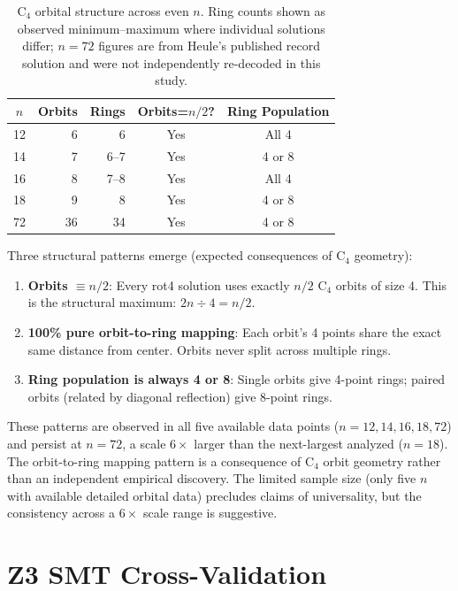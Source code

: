 \documentclass[11pt,a4paper]{article}
\theoremstyle{plain}
\theoremstyle{definition}
\begin{document}
\begin{table}[H]
\centering
\caption{C$_4$ orbital structure across even $n$. Ring counts shown as observed minimum--maximum where individual solutions differ; $n=72$ figures are from Heule's published record solution and were not independently re-decoded in this study.}
\label{tab:c4evol}
\begin{tabular}{crrcc}
\toprule
$n$ & Orbits & Rings & Orbits=$n/2$? & Ring Population \\
\midrule
12 & 6 & 6 & Yes & All 4 \\
14 & 7 & 6--7 & Yes & 4 or 8 \\
16 & 8 & 7--8 & Yes & All 4 \\
18 & 9 & 8 & Yes & 4 or 8 \\
72 & 36 & 34 & Yes & 4 or 8 \\
\bottomrule
\end{tabular}
\end{table}

Three structural patterns emerge (expected consequences of C$_4$ geometry):

\begin{enumerate}[nosep]
\item \textbf{Orbits $\equiv n/2$}: Every rot4 solution uses exactly $n/2$ C$_4$ orbits of size 4. This is the structural maximum: $2n\div4=n/2$.
\item \textbf{100\% pure orbit-to-ring mapping}: Each orbit's 4 points share the exact same distance from center. Orbits never split across multiple rings.
\item \textbf{Ring population is always 4 or 8}: Single orbits give 4-point rings; paired orbits (related by diagonal reflection) give 8-point rings.
\end{enumerate}

These patterns are observed in all five available data points ($n=12,14,16,18,72$) and persist at $n=72$, a scale $6\times$ larger than the next-largest analyzed ($n=18$). The orbit-to-ring mapping pattern is a consequence of C$_4$ orbit geometry rather than an independent empirical discovery. The limited sample size (only five $n$ with available detailed orbital data) precludes claims of universality, but the consistency across a $6\times$ scale range is suggestive.

\section{Z3 SMT Cross-Validation}
\label{sec:z3}
\end{document}
